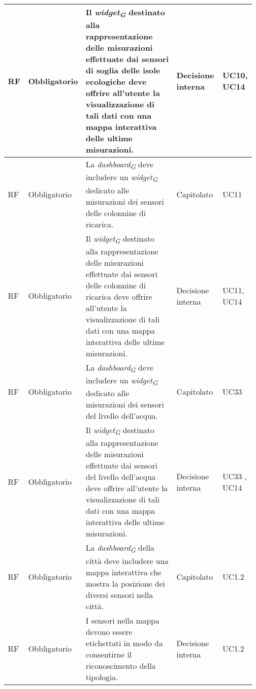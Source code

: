 \begin{longtable}{|C{1.5cm}|C{2cm}|L{5cm}|C{2cm}|C{1.5cm}|}
    \hline
     RF & Obbligatorio &Il \textit{widget}\textsubscript{\textit{G}} destinato alla rappresentazione delle misurazioni effettuate dai sensori di soglia delle isole ecologiche deve offrire all'utente la visualizzazione di tali dati con una mappa interattiva delle ultime misurazioni.  & Decisione interna & UC10, UC14 \\
    
    \hline
     RF & Obbligatorio & La \textit{dashboard}\textsubscript{\textit{G}} deve includere un \textit{widget}\textsubscript{\textit{G}} dedicato alle misurazioni dei sensori delle colonnine di ricarica. & Capitolato & UC11 \\
    
    \hline
     RF & Obbligatorio &Il \textit{widget}\textsubscript{\textit{G}} destinato alla rappresentazione delle misurazioni effettuate dai sensori delle colonnine di ricarica deve offrire all'utente la visualizzazione di tali dati con una mappa interattiva delle ultime misurazioni.  & Decisione interna & UC11, UC14 \\
    
    \hline
     RF & Obbligatorio & La \textit{dashboard}\textsubscript{\textit{G}} deve includere un \textit{widget}\textsubscript{\textit{G}} dedicato alle misurazioni dei sensori del livello dell'acqua. & Capitolato & UC33 \\
    
    \hline
     RF & Obbligatorio &Il \textit{widget}\textsubscript{\textit{G}} destinato alla rappresentazione delle misurazioni effettuate dai sensori del livello dell'acqua deve offrire all'utente la visualizzazione di tali dati con una mappa interattiva delle ultime misurazioni. & Decisione interna & UC33 , UC14\\
    
    \hline
     RF & Obbligatorio & La \textit{dashboard}\textsubscript{\textit{G}} della città deve includere una mappa interattiva che mostra la posizione dei diversi sensori nella città.& Capitolato & UC1.2 \\
    
    \hline
     RF & Obbligatorio & I sensori nella mappa devono essere etichettati in modo da consentirne il riconoscimento della tipologia.& Decisione interna & UC1.2 \\
    

\end{longtable}
